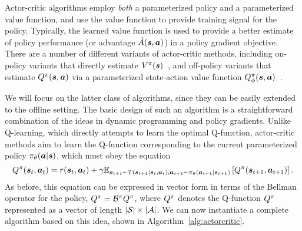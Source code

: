 \documentclass[../thesis.tex]{subfiles}
\begin{document}
Actor-critic algorithms employ \emph{both} a parameterized policy and a parameterized value function, and use the value function to provide training signal for the policy. Typically, the learned value function is used to provide a better estimate of policy performance (or advantage $\hat{A}(\boldsymbol{s},\boldsymbol{a})$) in a policy gradient objective. There are a number of different variants of actor-critic methods, including on-policy variants that directly estimate $V^\pi(\boldsymbol{s})$~\citep{konda2000actor}, and off-policy variants that estimate $Q^\pi(\boldsymbol{s},\boldsymbol{a})$ via a parameterized state-action value function $Q^\pi_\phi(\boldsymbol{s},\boldsymbol{a})$~\citep{sac,haarnoja2017reinforcement,heess2015learning}. 

We will focus on the latter class of algorithms, since they can be easily extended to the offline setting. The basic design of such an algorithm is a straightforward combination of the ideas in dynamic programming and policy gradients. Unlike Q-learning, which directly attempts to learn the optimal Q-function, actor-critic methods aim to learn the Q-function corresponding to the current parameterized policy $\pi_\theta(\boldsymbol{a} | \boldsymbol{s})$, which must obey the equation
\[
Q^\pi(\boldsymbol{s}_t, \boldsymbol{a}_t) = r(\boldsymbol{s}_t,\boldsymbol{a}_t) + \gamma \mathbb{E}_{\boldsymbol{s}_{t+1} \sim T(\boldsymbol{s}_{t+1}|\boldsymbol{s}_t,\boldsymbol{a}_t), \boldsymbol{a}_{t+1} \sim \pi_\theta(\boldsymbol{a}_{t+1} | \boldsymbol{s}_{t+1})}\left[
Q^\pi(\boldsymbol{s}_{t+1},\boldsymbol{a}_{t+1})
\right].
\]
As before, this equation can be expressed in vector form in terms of the Bellman operator for the policy, ${Q}^\pi = \mathcal{B}^\pi {Q}^\pi$, where ${Q}^\pi$ denotes the Q-function $Q^\pi$ represented as a vector of length $|\mathcal{S}|\times |\mathcal{A}|$. We can now instantiate a complete algorithm based on this idea, shown in Algorithm~\ref{alg:actorcritic}.
\end{document}
